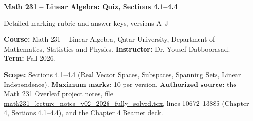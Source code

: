 \documentclass[11pt,a4paper]{article}
\begin{document}
{\LARGE\bfseries\textcolor{Brand}{Math 231 -- Linear Algebra: Quiz, Sections 4.1--4.4}}\par
{\large Detailed marking rubric and answer keys, versions A--J}\par\vspace{2mm}
\textbf{Course:} Math 231 -- Linear Algebra, Qatar University, Department of Mathematics, Statistics and Physics. \quad \textbf{Instructor:} Dr. Yousef Dabboorasad. \quad \textbf{Term:} Fall 2026.\par
\textbf{Scope:} Sections 4.1--4.4 (Real Vector Spaces, Subspaces, Spanning Sets, Linear Independence). \quad \textbf{Maximum marks:} 10 per version. \quad \textbf{Authorized source:} the Math 231 Overleaf project notes, file \url{math231_lecture_notes_v02_2026_fully_solved.tex}, lines 10672--13885 (Chapter 4, Sections 4.1--4.4), and the Chapter 4 Beamer deck.\par
\end{document}
